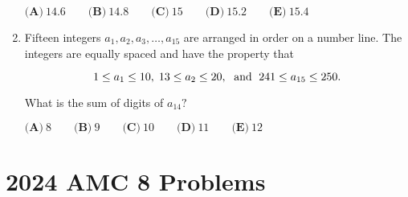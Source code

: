 \documentclass{article}
\begin{document}
\begin{enumerate}[label=\arabic*., itemsep=0.5em]
\(\textbf{(A)}\ 14.6 \qquad \textbf{(B)}\ 14.8 \qquad \textbf{(C)}\ 15 \qquad \textbf{(D)}\ 15.2 \qquad \textbf{(E)}\ 15.4\)\par \vspace{0.5em}\item Fifteen integers \(a_1, a_2, a_3, \dots, a_{15}\) are arranged in order on a number line. The integers are equally spaced and have the property that

\begin{equation*}
1 \le a_1 \le 10, \thickspace 13 \le a_2 \le 20, \thickspace \text{ and } \thickspace 241 \le a_{15}\le 250.
\end{equation*}

What is the sum of digits of \(a_{14}?\)

\(\textbf{(A)}\ 8 \qquad \textbf{(B)}\ 9 \qquad \textbf{(C)}\ 10 \qquad \textbf{(D)}\ 11 \qquad \textbf{(E)}\ 12\)\par \vspace{0.5em}\end{enumerate}\newpage\section*{2024 AMC 8 Problems}
\end{document}
